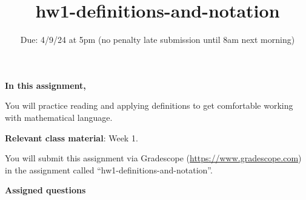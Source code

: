 

\title{hw1-definitions-and-notation}
\date{Due: 4/9/24 at 5pm (no penalty late submission until 8am next morning)}

\maketitle
\thispagestyle{fancy}


{\bf In this assignment,}

You will practice reading and
applying definitions to get comfortable working with mathematical language.

{\bf Relevant class material}: Week 1.

You will submit this assignment via Gradescope
(\href{https://www.gradescope.com}{https://www.gradescope.com}) 
in the assignment called ``hw1-definitions-and-notation''.

\instructions


{\bf Assigned questions}

